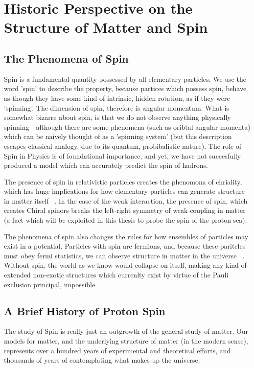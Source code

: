 \chapter{Historic Perspective on the Structure of Matter and Spin}
\section{The Phenomena of Spin}

Spin is a fundamental quantity possessed by all elementary particles. We use
the word 'spin' to describe the property, because partices which possess spin,
behave as though they have some kind of intrinsic, hidden rotation, as if they
were 'spinning'. The dimension of spin, therefore is angular momentum. What is
somewhat bizarre about spin, is that we do not observe anything physically
spinning - although there are some phenomena (such as oribtal angular momenta)
which can be naively thought of as a 'spinning system' (but this description
escapes classical analogy, due to its quantum, probibalistic nature). The role
of Spin in Physics is of foundational importance, and yet, we have not
succesfully produced a model which can accurately predict the spin of hadrons.

The presence of spin in relativistic particles creates the phenomona of
chriality, which has huge implications for how elementary particles can generate
structure in matter itself ~\needcite{}. In the case of the weak interaction,
the presence of spin, which creates Chiral spinors breaks the left-right
symmetry of weak coupling in matter (a fact which will be exploited in this
thesis to probe the spin of the proton sea).

The phenomena of spin also changes the rules for how ensembles of particles may
exist in a potential. Particles with spin are fermions, and because these
paritcles must obey fermi statistics, we can observe structure in matter in the
universe ~\needcite{}. Without spin, the world as we know would collapse on
itself, making any kind of extended non-exotic structures which currenlty exist
by virtue of the Pauli exclusion principal, impossible.

\clearpage
\section{A Brief History of Proton Spin}

The study of Spin is really just an outgrowth of the general study of matter.
Our models for matter, and the underlying structure of matter (in the modern
sense), represents over a hundred years of experimental and theoretical efforts,
and thousands of years of contemplating what makes up the universe.

